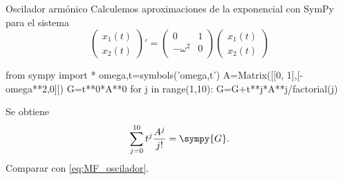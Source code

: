 \begin{ejemplo}{Oscilador armónico}
Calculemos aproximaciones de la exponencial con SymPy para el sistema
\[
 \begin{pmatrix}
  x_1(t)\\
  x_2(t)
 \end{pmatrix}'=\begin{pmatrix}
 0 & 1\\
 -\omega^2 & 0\\
  \end{pmatrix}
 \begin{pmatrix}
  x_1(t)\\
  x_2(t)
 \end{pmatrix}
\]

\begin{sympyblock}[][numbers=left,frame=single,framesep=5mm]
from sympy import *
omega,t=symbols('omega,t')
A=Matrix([[0, 1],[-omega**2,0]])
G=t**0*A**0
for j in range(1,10):
    G=G+t**j*A**j/factorial(j)
\end{sympyblock}

Se obtiene
\begin{equation}\label{eq:MF_resort}
 \sum_{j=0}^{10}t^j\frac{A^j}{j!}=\sympy{G}.
\end{equation}
Comparar  con \eqref{eq:MF_oscilador}.
\end{ejemplo}



